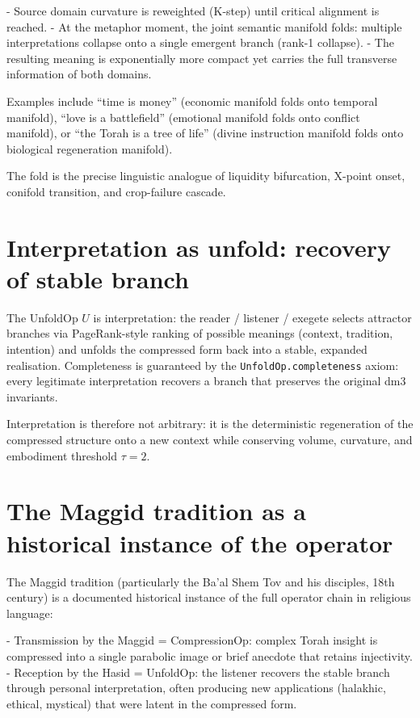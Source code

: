 \documentclass[19pt]{book}
\theoremstyle{plain}
\theoremstyle{definition}
\theoremstyle{remark}
\begin{document}
- Source domain curvature is reweighted (K-step) until critical alignment is reached.
- At the metaphor moment, the joint semantic manifold folds: multiple interpretations collapse onto a single emergent branch (rank-1 collapse).
- The resulting meaning is exponentially more compact yet carries the full transverse information of both domains.

Examples include “time is money” (economic manifold folds onto temporal manifold), “love is a battlefield” (emotional manifold folds onto conflict manifold), or “the Torah is a tree of life” (divine instruction manifold folds onto biological regeneration manifold).

The fold is the precise linguistic analogue of liquidity bifurcation, X-point onset, conifold transition, and crop-failure cascade.

\section{Interpretation as unfold: recovery of stable branch}

The UnfoldOp \(U\) is interpretation: the reader / listener / exegete selects attractor branches via PageRank-style ranking of possible meanings (context, tradition, intention) and unfolds the compressed form back into a stable, expanded realisation. Completeness is guaranteed by the \texttt{UnfoldOp.completeness} axiom: every legitimate interpretation recovers a branch that preserves the original dm3 invariants.

Interpretation is therefore not arbitrary: it is the deterministic regeneration of the compressed structure onto a new context while conserving volume, curvature, and embodiment threshold \(\tau = 2\).

\section{The Maggid tradition as a historical instance of the operator}

The Maggid tradition (particularly the Ba’al Shem Tov and his disciples, 18th century) is a documented historical instance of the full operator chain in religious language:

- Transmission by the Maggid = CompressionOp: complex Torah insight is compressed into a single parabolic image or brief anecdote that retains injectivity.
- Reception by the Hasid = UnfoldOp: the listener recovers the stable branch through personal interpretation, often producing new applications (halakhic, ethical, mystical) that were latent in the compressed form.
\end{document}
